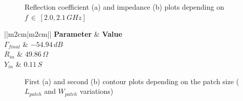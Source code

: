 \documentclass[10 pt,a4paper,twocolumn]{article}
\begin{document}
{%

\begin{figure}[bt!]
	\centering
	\begin{subfigure}[b]{0.42\linewidth}
		\def\svgwidth{\linewidth}
		\tiny{}
		\caption{}
	\end{subfigure}
\hspace{0.1\linewidth}
	\begin{subfigure}[b]{0.4\linewidth}
		\def\svgwidth{\linewidth}
		\tiny{}
		\caption{}
	\end{subfigure}
	\caption{Reflection coefficient (a) and impedance (b) plots depending on $f\,\in\,[2.0,2.1\,GHz]$}
	\label{fig:Gamma and Z previa wfeed}
\end{figure}


\begin{table}
	\begin{center}
		{	\begin{tabular}{||m{2cm}|m{2cm}||}
				\hline
				\textbf{Parameter} & \textbf{Value}\\
				\hline
				$\Gamma_{final}$ & $-54.94\,dB$\\
				\hline
				$R_{in}$ & $49.86\,\Omega$ \\
				\hline
				$Y_{in}$ & $ 0.11\,S$ \\
				\hline
		\end{tabular}}
		\caption{Final $\Gamma$ and impedance matching values after $w_{feed}$ change}
		\label{table:Gamma and Z}
	\end{center}
\end{table}
\begin{figure}[bt!]
	\begin{subfigure}{0.48\linewidth}
		\def\svgwidth{\linewidth}
		\tiny{}
		\caption{}
		\label{fig:first contour}
	\end{subfigure}
	\hfill
	\begin{subfigure}{0.48\linewidth}
		\def\svgwidth{\linewidth}
		\tiny{}
		\caption{}
		\label{fig:second contour}
	\end{subfigure}
	\caption{First (a) and second (b) contour plots depending on the patch size ($L_{patch}$ and $W_{patch}$ variations)}
\end{figure}


}
\end{document}
